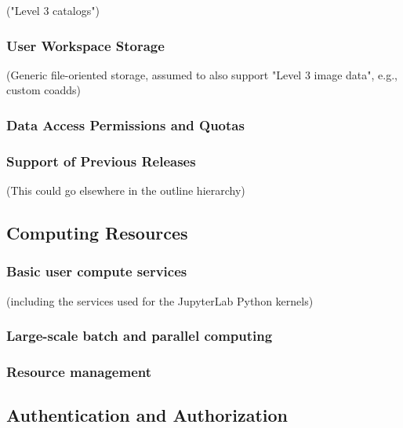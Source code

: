\documentclass[DM,lsstdraft,toc]{lsstdoc}
\begin{document}
("Level 3 catalogs")

\subsubsection{User Workspace Storage}\label{user-workspace-storage}

(Generic file-oriented storage, assumed to also support "Level 3 image data", e.g., custom coadds)

\subsubsection{Data Access Permissions and Quotas}\label{data-access-permissions-and-quotas}

\subsubsection{Support of Previous Releases}\label{support-of-previous-releases}

(This could go elsewhere in the outline hierarchy)

\subsection{Computing Resources}\label{computing-resources}

\subsubsection{Basic user compute services}\label{basic-user-compute-services}

(including the services used for the JupyterLab Python kernels)

\subsubsection{Large-scale batch and parallel computing}\label{large-scale-batch-and-parallel-computing}

\subsubsection{Resource management}\label{resource-management}

\subsection{Authentication and Authorization}\label{authentication-and-authorization}
\end{document}
